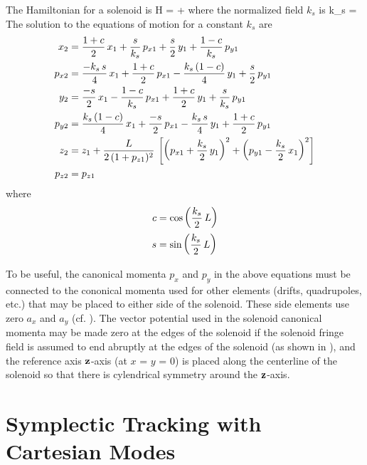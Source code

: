 The Hamiltonian for a solenoid is
\Begineq
  H =  + 
\Endeq
where the normalized field $k_s$ is
\Begineq
  k_s = 
\Endeq
The solution to the equations of motion for a constant $k_s$ are
\begin{align}
  x_2    &= \frac{1 + c}{2} \, x_1 + \frac{s}{k_s} \, p_{x1} +
           \frac{s}{2} \, y_1 + \frac{1 - c}{k_s} \, p_{y1} \nonumber \\
  p_{x2} &= \frac{-k_s \, s}{4} \, x_1 + \frac{1 + c}{2} \, p_{x1} - 
           \frac{k_s \, (1 - c)}{4} \, y_1 + \frac{s}{2} \, p_{y1} \nonumber \\
  y_2    &= \frac{-s}{2} \, x_1 - \frac{1 - c}{k_s} \, p_{x1} +
           \frac{1 + c}{2} \, y_1 + \frac{s}{k_s} \, p_{y1} \\      
  p_{y2} &= \frac{k_s \, (1 - c)}{4} \, x_1 + \frac{-s}{2} \, p_{x1} -
            \frac{k_s \, s}{4} \, y_1 + \frac{1 + c}{2} \, p_{y1} \nonumber \\ 
  z_2    &= z_1 + \frac{L}{2 \, (1 + p_{z1})^2} \, 
                   \left[ \left( p_{x1} + \frac{k_s}{2} \, y_1 \right)^2 +
                          \left( p_{y1} - \frac{k_s}{2} \, x_1 \right)^2 \right] \nonumber \\
  p_{z2} &= p_{z1} \nonumber
\end{align}
where
\begin{align}
  c &= \cos \left( \frac{k_s}{2} \, L \right) \nonumber \\
  s &= \sin \left( \frac{k_s}{2} \, L \right)
\end{align}

To be useful, the canonical momenta $p_x$ and $p_y$ in the above
equations must be connected to the cononical momenta used for other
elements (drifts, quadrupoles, etc.) that may be placed to either side
of the solenoid. These side elements use zero $a_x$ and $a_y$
(cf. ). The vector potential used in the solenoid canonical
momenta may be made zero at the edges of the solenoid if the solenoid
fringe field is assumed to end abruptly at the edges of the solenoid
(as shown in ), and the reference axis ${\bf z}$-axis (at
$x$ = $y$ = 0) is placed along the centerline of the solenoid so that
there is cylendrical symmetry around the ${\bf z}$-axis.

\section{Symplectic Tracking with Cartesian Modes}
\label{s:wiggler.std}

